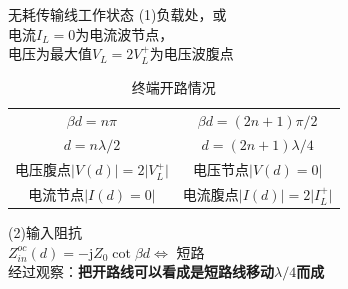 \begin{frame}{无耗传输线工作状态}
  (1)负载处，或\\
  电流$I_{L}=0$为电流波节点，\\
  电压为最大值$V_{L}=2V_{L}^{+}$为电压波腹点
  \begin{table}[h!]
    \begin{center}
      \caption{终端开路情况}
      \begin{tabular}{|c|c|}
        \hline
        $\beta d=n\pi$                                  & $\beta d=(2n+1)\pi/2$                           \\
        $d=n\lambda/2$                                  & $d=(2n+1)\lambda/4$                             \\
        \hline
        电压腹点$\lvert V(d)\rvert=2\lvert V_{L}^{+}\rvert$ & 电压节点$\lvert V(d)=0\rvert$                       \\
        电流节点$\lvert I(d)=0\rvert$                       & 电流腹点$\lvert I(d)\rvert=2\lvert I_{L}^{+}\rvert$ \\
        \hline
      \end{tabular}
    \end{center}
  \end{table}
  (2)输入阻抗\\
  $Z_{in}^{oc}(d)=-\mathrm{j}Z_{0}\cot\beta d\Longleftrightarrow$ 短路 \\
  经过观察：\textbf{把开路线可以看成是短路线移动$\lambda/4$而成}
\end{frame}



